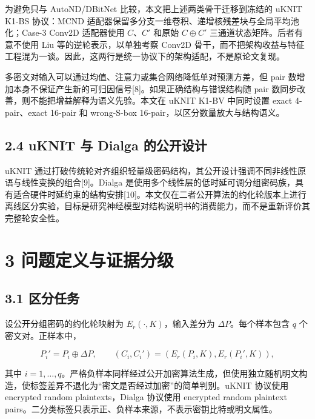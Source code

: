 \documentclass[
  a4paper,
  UTF8]{ctexart}
\begin{document}
为避免只与 AutoND/DBitNet 比较，本文把上述两类骨干迁移到冻结的 uKNIT
K1-BS 协议：MCND
适配器保留多分支一维卷积、递增核残差块与全局平均池化；Case-3 Conv2D
适配器使用 \(C\)、\(C'\) 和原始 \(C\oplus C'\)
三通道状态矩阵。后者有意不使用 Liu 等的逆轮表示，以单独考察 Conv2D
骨干，而不把架构收益与特征工程混为一谈。因此，这两行是统一协议下的架构适配，不是原论文复现。

多密文对输入可以通过均值、注意力或集合网络降低单对预测方差，但 pair
数增加本身不保证产生新的可归因信号{[}8{]}。如果正确结构与错误结构随 pair
数同步改善，则不能把增益解释为语义先验。本文在 uKNIT K1-BV 中同时设置
exact 4-pair、exact 16-pair 和 wrong-S-box
16-pair，以区分数量放大与结构语义。

\hypertarget{uknit-ux4e0e-dialga-ux7684ux516cux5f00ux8bbeux8ba1}{%
\subsection{2.4 uKNIT 与 Dialga
的公开设计}\label{uknit-ux4e0e-dialga-ux7684ux516cux5f00ux8bbeux8ba1}}

uKNIT
通过打破传统轮对齐组织轻量级密码结构，其公开设计强调不同非线性原语与线性变换的组合{[}9{]}。Dialga
是使用多个线性层的低时延可调分组密码族，具有适合硬件时延约束的结构安排{[}10{]}。本文仅在二者公开算法的约化轮版本上进行离线区分实验，目标是研究神经模型对结构说明书的消费能力，而不是重新评价其完整轮安全性。

\hypertarget{ux95eeux9898ux5b9aux4e49ux4e0eux8bc1ux636eux5206ux7ea7}{%
\section{3
问题定义与证据分级}\label{ux95eeux9898ux5b9aux4e49ux4e0eux8bc1ux636eux5206ux7ea7}}

\hypertarget{ux533aux5206ux4efbux52a1}{%
\subsection{3.1 区分任务}\label{ux533aux5206ux4efbux52a1}}

设公开分组密码的约化轮映射为 \(E_r(\cdot,K)\)，输入差分为
\(\Delta P\)。每个样本包含 \(q\) 个密文对。正样本中，

\[
P_i'=P_i\oplus \Delta P,\qquad
(C_i,C_i')=(E_r(P_i,K),E_r(P_i',K)),
\]

其中
\(i=1,\ldots,q\)。严格负样本同样经过公开加密算法生成，但使用独立随机明文构造，使标签差异不退化为``密文是否经过加密''的简单判别。uKNIT
协议使用 encrypted random plaintexts，Dialga 协议使用 encrypted random
plaintext
pairs。二分类标签只表示正、负样本来源，不表示密钥比特或明文属性。
\end{document}
